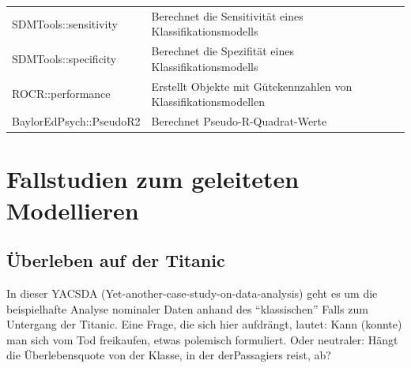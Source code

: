 \documentclass[12pt,ngerman,]{book}
\theoremstyle{definition}
\theoremstyle{definition}
\theoremstyle{remark}
\begin{document}
\begin{longtable}[]{@{}ll@{}}
\begin{minipage}[t]{0.38\columnwidth}
SDMTools::sensitivity\strut
\end{minipage} & \begin{minipage}[t]{0.42\columnwidth}\raggedright\strut
Berechnet die Sensitivität eines Klassifikationsmodells\strut
\end{minipage}\tabularnewline
\begin{minipage}[t]{0.38\columnwidth}\raggedright\strut
SDMTools::specificity\strut
\end{minipage} & \begin{minipage}[t]{0.42\columnwidth}\raggedright\strut
Berechnet die Spezifität eines Klassifikationsmodells\strut
\end{minipage}\tabularnewline
\begin{minipage}[t]{0.38\columnwidth}\raggedright\strut
ROCR::performance\strut
\end{minipage} & \begin{minipage}[t]{0.42\columnwidth}\raggedright\strut
Erstellt Objekte mit Gütekennzahlen von Klassifikationsmodellen\strut
\end{minipage}\tabularnewline
\begin{minipage}[t]{0.38\columnwidth}\raggedright\strut
BaylorEdPsych::PseudoR2\strut
\end{minipage} & \begin{minipage}[t]{0.42\columnwidth}\raggedright\strut
Berechnet Pseudo-R-Quadrat-Werte\strut
\end{minipage}\tabularnewline
\bottomrule
\end{longtable}

\chapter{Fallstudien zum geleiteten
Modellieren}\label{fallstudien-zum-geleiteten-modellieren}

\section{Überleben auf der Titanic}\label{uberleben-auf-der-titanic}

In dieser YACSDA (Yet-another-case-study-on-data-analysis) geht es um
die beispielhafte Analyse nominaler Daten anhand des ``klassischen''
Falls zum Untergang der Titanic. Eine Frage, die sich hier aufdrängt,
lautet: Kann (konnte) man sich vom Tod freikaufen, etwas polemisch
formuliert. Oder neutraler: Hängt die Überlebensquote von der Klasse, in
der derPassagiers reist, ab?
\end{document}

